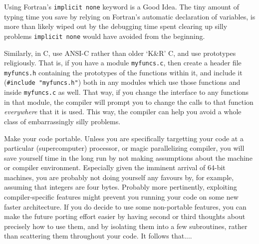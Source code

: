 \documentclass[11pt,oneside,chapters]{starlink}
\begin{document}

Using Fortran's \texttt{implicit none} keyword is a
Good Idea.  The tiny amount of typing time you save by
relying on Fortran's automatic declaration of variables,
is more than likely wiped out by the debugging time spent
clearing up silly problems \texttt{implicit none}
would have avoided from the beginning.

Similarly, in C, use ANSI-C rather than older `K\&R'
C, and use prototypes religiously.  That is, if you have a
module \texttt{myfuncs.c}, then create a header file
\texttt{myfuncs.h} containing the prototypes of the
functions within it, and include it (\texttt{\#include "myfuncs.h"})
both in any modules which use those
functions and inside \texttt{myfuncs.c} as well.  That
way, if you change the interface to any functions in that
module, the compiler will prompt you to change the calls
to that function \emph{everywhere} that it is used.
This way, the compiler can help you avoid a whole class of
embarrassingly silly problems.

Make your code portable.  Unless you are specifically
targetting your code at a particular (supercomputer)
processor, or magic parallelizing compiler, you will save
yourself time in the long run by not making assumptions
about the machine or compiler environment.  Especially
given the imminent arrival of 64-bit machines, you are
probably not doing yourself any favours by, for example,
assuming that integers are four bytes.  Probably more
pertinently, exploiting compiler-specific features might
prevent you running your code on some new faster
architecture.  If you do decide to use some non-portable
features, you can make the future porting effort easier by
having second or third thoughts about precisely how to use
them, and by isolating them into a few subroutines, rather
than scattering them throughout your code.  It follows
that....
\end{document}
